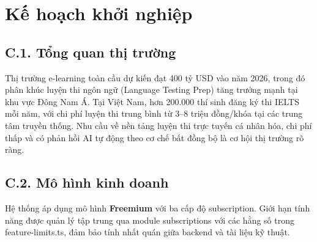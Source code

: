 \chapter{Kế hoạch khởi nghiệp}
\thispagestyle{appendixstyle}
\label{app:khoinghiep}

\section*{C.1. Tổng quan thị trường}

Thị trường e-learning toàn cầu dự kiến đạt 400 tỷ USD vào năm 2026, trong đó phân khúc luyện thi ngôn ngữ (Language Testing Prep) tăng trưởng mạnh tại khu vực Đông Nam Á. Tại Việt Nam, hơn 200.000 thí sinh đăng ký thi IELTS mỗi năm, với chi phí luyện thi trung bình từ 3--8 triệu đồng/khóa tại các trung tâm truyền thống. Nhu cầu về nền tảng luyện thi trực tuyến cá nhân hóa, chi phí thấp và có phản hồi AI tự động theo cơ chế bất đồng bộ là cơ hội thị trường rõ ràng.

\section*{C.2. Mô hình kinh doanh}

Hệ thống áp dụng mô hình \textbf{Freemium} với ba cấp độ subscription. Giới hạn tính năng được quản lý tập trung qua module subscriptions với các hằng số trong feature-limits.ts, đảm bảo tính nhất quán giữa backend và tài liệu kỹ thuật.

